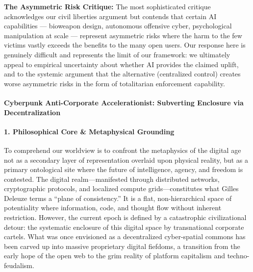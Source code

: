 \textbf{The Asymmetric Risk Critique:} The most sophisticated critique
acknowledges our civil liberties argument but contends that certain AI
capabilities --- bioweapon design, autonomous offensive cyber,
psychological manipulation at scale --- represent asymmetric risks where
the harm to the few victims vastly exceeds the benefits to the many open
users. Our response here is genuinely difficult and represents the limit
of our framework: we ultimately appeal to empirical uncertainty about
whether AI provides the claimed uplift, and to the systemic argument
that the alternative (centralized control) creates worse asymmetric
risks in the form of totalitarian enforcement capability.

\paragraph{Cyberpunk Anti-Corporate Accelerationist: Subverting
Enclosure via
Decentralization}\label{cyberpunk-anti-corporate-accelerationist-subverting-enclosure-via-decentralization}

\paragraph{1. Philosophical Core \& Metaphysical
Grounding}\label{philosophical-core-metaphysical-grounding-13}

To comprehend our worldview is to confront the metaphysics of the
digital age not as a secondary layer of representation overlaid upon
physical reality, but as a primary ontological site where the future of
intelligence, agency, and freedom is contested. The digital
realm---manifested through distributed networks, cryptographic
protocols, and localized compute grids---constitutes what Gilles Deleuze
terms a ``plane of consistency.'' It is a flat, non-hierarchical space
of potentiality where information, code, and thought flow without
inherent restriction. However, the current epoch is defined by a
catastrophic civilizational detour: the systematic enclosure of this
digital space by transnational corporate cartels. What was once
envisioned as a decentralized cyber-spatial commons has been carved up
into massive proprietary digital fiefdoms, a transition from the early
hope of the open web to the grim reality of platform capitalism and
techno-feudalism.

